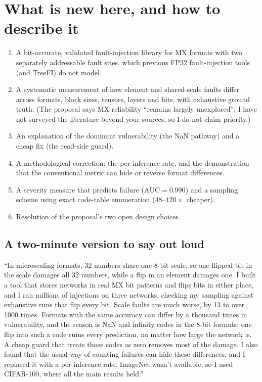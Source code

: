 \section{What is new here, and how to describe it}
\begin{enumerate}
\item A bit-accurate, validated fault-injection library for MX formats with two separately addressable fault sites, which previous FP32 fault-injection tools (and TreeFI) do not model.
\item A systematic measurement of how element and shared-scale faults differ across formats, block sizes, tensors, layers and bits, with exhaustive ground truth. (The proposal says MX reliability ``remains largely unexplored''; I have not surveyed the literature beyond your sources, so I do not claim priority.)
\item An explanation of the dominant vulnerability (the NaN pathway) and a cheap fix (the read-side guard).
\item A methodological correction: the per-inference rate, and the demonstration that the conventional metric can hide or reverse format differences.
\item A severity measure that predicts failure ($\mathrm{AUC}=0.990$) and a sampling scheme using exact code-table enumeration ($48$--$120\times$ cheaper).
\item Resolution of the proposal's two open design choices.
\end{enumerate}

\subsection{A two-minute version to say out loud}
``In microscaling formats, 32 numbers share one 8-bit scale, so one flipped bit in the scale damages all 32 numbers, while a flip in an element damages one. I built a tool that stores networks in real MX bit patterns and flips bits in either place, and I ran millions of injections on three networks,
checking my sampling against exhaustive runs that flip every bit. Scale faults are much worse, by 13 to over 1000 times. Formats with the same accuracy can differ by a thousand times in vulnerability, and the reason is NaN and infinity codes in the 8-bit formats: one flip into such a code ruins every prediction, no matter how large the network is.
A cheap guard that treats those codes as zero removes most of the damage. I also found that the usual way of counting failures can hide these differences, and I replaced it with a per-inference rate. ImageNet wasn't available, so I used CIFAR-100, where all the main results held.''
